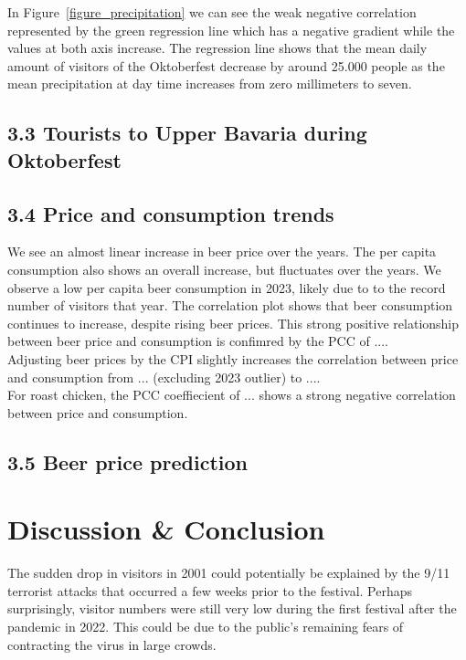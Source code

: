 \documentclass{article}
\theoremstyle{plain}
\theoremstyle{definition}
\theoremstyle{remark}
\begin{document}
\noindent
In Figure~\ref{figure_precipitation} we can see the weak negative correlation represented by the green regression line which has a negative gradient while the values at both axis increase. The regression line shows that the mean daily amount of visitors of the Oktoberfest decrease by around 25.000 people as the mean precipitation at day time increases from zero millimeters to seven.\\
\subsection*{3.3 Tourists to Upper Bavaria during Oktoberfest}
\subsection*{3.4 Price and consumption trends}
We see an almost linear increase in beer price over the years. The per capita consumption also shows an overall increase, but fluctuates over the years. We observe a low per capita beer consumption in 2023, likely due to to the record number of visitors that year. The correlation plot shows that beer consumption continues to increase, despite rising beer prices. This strong positive relationship between beer price and consumption is confimred by the PCC of .... \\
Adjusting beer prices by the CPI slightly increases the correlation between price and consumption from ... (excluding 2023 outlier) to ....\\
For roast chicken, the PCC coeffiecient of ... shows a strong negative correlation between price and consumption.
\subsection*{3.5 Beer price prediction}

\section{Discussion \& Conclusion}\label{sec:conclusion}
The sudden drop in visitors in 2001 could potentially be explained by the 9/11 terrorist attacks that occurred a few weeks prior to the festival. Perhaps surprisingly, visitor numbers were still very low during the first festival after the pandemic in 2022. This could be due to the public's remaining fears of contracting the virus in large crowds.\\
\end{document}
